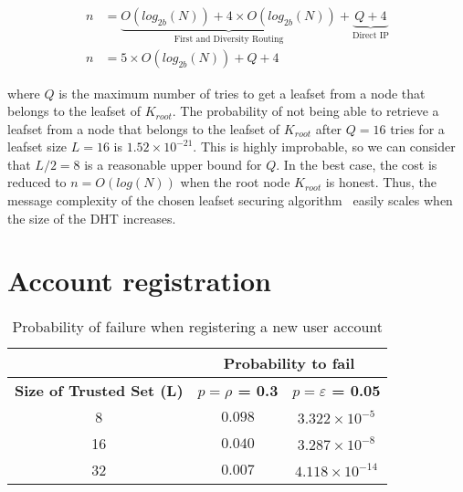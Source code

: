       \begin{align} \label{eq:p_leafset}
        n &= \underbrace{O(log_{2b}(N)) + 4 \times O(log_{2b}(N))}_\text{First
and Diversity Routing} + \underbrace{Q+4}_\text{Direct IP} \\
        n &= 5 \times O(log_{2b}(N)) +  Q+4 
      \end{align}
      
      where $Q$ is the maximum number of tries to get a leafset from a node
that belongs to the leafset of $K_{root}$. The probability of not being able to
retrieve a leafset from a node that belongs to the leafset of $K_{root}$ after
$Q = 16$ tries for a leafset size $ L = 16$ is $1.52 \times 10^{-21} $. This is
highly improbable, so we can consider that $L/2 = 8$ is a reasonable upper
bound for $Q$. 
      In the best case, the cost is reduced to $n = O(log(N))$ when the root
node $K_{root}$ is honest. Thus, the message complexity of the chosen leafset
securing algorithm~\cite{p2p_certification} easily scales when the size of the
DHT increases.





%

\section{Account registration}
\label{sec:eval_account_registration}
  \begin{table}
    \centering
    \footnotesize
    \begin{tabular}{|c|c|c|}
      \cline{2-3}
      \multicolumn{1}{c|}{}&  \multicolumn{2}{c|}{\textbf{Probability to fail}} \\ \cline{2-3}
      \hline
      \textbf{Size of Trusted Set (L)} & \textbf{$p = \rho$ = 0.3} & \textbf{$p = \varepsilon$ = 0.05} \\
      \hline \hline

      8 &  $0.098$ & $3.322 \times 10^{-5}$ \\
      \hline
      16 & $0.040$ & $3.287 \times 10^{-8}$  \\
      \hline
      32 & $0.007$ & $4.118 \times 10^{-14}$  \\
      \hline
    \end{tabular}
    \caption{Probability of failure when registering a new user account}
    \label{tab:p_account_registration}
  \end{table}
  

